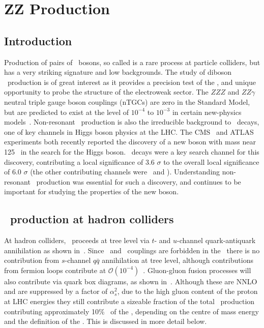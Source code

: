 \graphicspath{{Chapters/TheoryZZProduction/Figures/}}
\chapter{ZZ Production}
\label{chap:TheoryZZProduction}

\section{Introduction}

Production of pairs of \Z\ bosons, so called  is a
rare process at particle colliders, but has a very striking signature
and low backgrounds. The study of diboson \ZZ\ production is of great interest
as it provides a precision test of the \sm, and unique opportunity to
probe the structure of the electroweak sector. 
The $ZZZ$ and $ZZ\gamma$ neutral triple gauge boson
couplings (nTGCs) are zero in the Standard Model, but are predicted to exist at the
level of $10^{-4}$ to $10^{-3}$ in certain new-physics
models~\cite{Ellison:1998}. Non-resonant \ZZ\ production is also the
irreducible background to \HZZ\ decays, one of key channels in Higgs boson physics
at the LHC. The CMS~\cite{CMS_Higgs:2012gu} and ATLAS~\cite{ATLAS_Higgs:2012gk}
experiments both recently reported the discovery of a new boson with mass near
125 \gev\ in the search for the Higgs boson. \HZZ\ decays were a key
search channel for this discovery, contributing a local significance of 3.6
$\sigma$ to the overall local significance of 6.0 $\sigma$ (the other
contributing channels were \Hgg\ and \HWW). Understanding non-resonant \ZZ\
production was essential for such a discovery, and continues to be important for
studying the properties of the new boson.

\section{\ZZ\ production at hadron colliders}

At hadron colliders, \qqZZ\ proceeds at tree level via $t$- and $u$-channel
quark-antiquark annihilation as shown in~\fig{theoryzz-fd-qqZZ}. Since \ZZZ\ and
\ZZg\ couplings are forbidden in the \sm\ there is no contribution from
$s$-channel $q\bar{q}$ annihilation at tree level, although contributions from
fermion loops contribute at $\mathcal{O}(10^{-4})$~\cite{Gounaris:2000dn}.
Gluon-gluon fusion processes will also
contribute via quark box diagrams, as shown in~. Although
these are NNLO and are suppressed by a factor of
$\alpha_s^2$, due to the high gluon content of the proton at LHC energies they
still contribute a sizeable fraction of the total \ZZ\ production \cx\,
contributing approximately 10\%~\cite{Campbell:2011} of the \cx,
depending on the centre of mass energy and the definition of the \cx.
This is discussed in more detail below.

